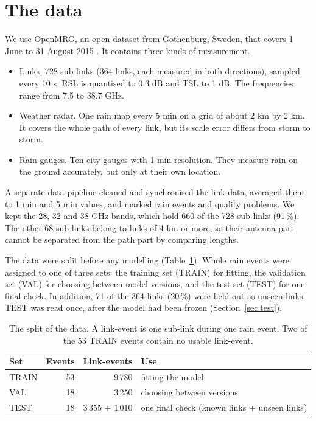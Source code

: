 \documentclass[11pt,a4paper]{article}
\begin{document}
\section{The data}
We use OpenMRG, an open dataset from Gothenburg, Sweden, that covers 1 June to 31 August 2015 \cite{openmrg}. It contains three
kinds of measurement.
\begin{itemize}[leftmargin=1.5em]
\item Links. 728 sub-links (364 links, each measured in both directions), sampled every 10 s. RSL is quantised to 0.3 dB and
TSL to 1 dB. The frequencies range from 7.5 to 38.7 GHz.
\item Weather radar. One rain map every 5 min on a grid of about 2 km by 2 km. It covers the whole path of every link, but its
scale error differs from storm to storm.
\item Rain gauges. Ten city gauges with 1 min resolution. They measure rain on the ground accurately, but only at their own
location.
\end{itemize}
A separate data pipeline cleaned and synchronised the link data, averaged them to 1 min and 5 min values, and marked rain
events and quality problems. We kept the 28, 32 and 38 GHz bands, which hold 660 of the 728 sub-links (91\,\%). The other 68
sub-links belong to links of 4 km or more, so their antenna part cannot be separated from the path part by comparing lengths.

The data were split before any modelling (Table~\ref{tab:split}). Whole rain events were assigned to one of three sets: the
training set (TRAIN) for fitting, the validation set (VAL) for choosing between model versions, and the test set (TEST) for one
final check. In addition, 71 of the 364 links (20\,\%) were held out as unseen links. TEST was read once, after the model had
been frozen (Section~\ref{sec:test}).

\begin{table}[H]
\centering
\caption{The split of the data. A link-event is one sub-link during one rain event. Two of the 53 TRAIN events contain no
usable link-event.}
\label{tab:split}
\begin{tabular}{lrrl}
\toprule
Set & Events & Link-events & Use\\
\midrule
TRAIN & 53 & 9\,780 & fitting the model\\
VAL & 18 & 3\,250 & choosing between versions\\
TEST & 18 & 3\,355 + 1\,010 & one final check (known links + unseen links)\\
\bottomrule
\end{tabular}
\end{table}
\end{document}
